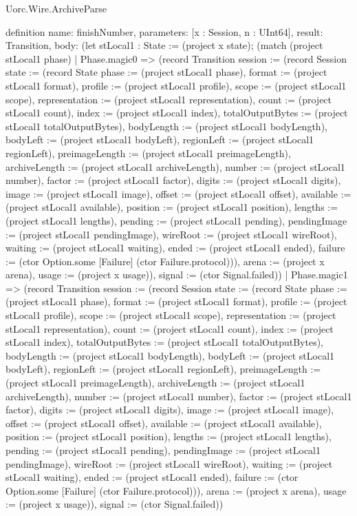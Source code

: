 \begin{lexlean}{Uorc.Wire.ArchiveParse}
\begin{semanticmodule}
definition{
  name: finishNumber,
  parameters: [x : Session, n : UInt64],
  result: Transition,
  body: (let stLocal1 : State := (project x state); (match (project stLocal1 phase)
    | Phase.magic0 => (record Transition {session := (record Session {state := (record State {phase := (project stLocal1 phase), format := (project stLocal1 format), profile := (project stLocal1 profile), scope := (project stLocal1 scope), representation := (project stLocal1 representation), count := (project stLocal1 count), index := (project stLocal1 index), totalOutputBytes := (project stLocal1 totalOutputBytes), bodyLength := (project stLocal1 bodyLength), bodyLeft := (project stLocal1 bodyLeft), regionLeft := (project stLocal1 regionLeft), preimageLength := (project stLocal1 preimageLength), archiveLength := (project stLocal1 archiveLength), number := (project stLocal1 number), factor := (project stLocal1 factor), digits := (project stLocal1 digits), image := (project stLocal1 image), offset := (project stLocal1 offset), available := (project stLocal1 available), position := (project stLocal1 position), lengths := (project stLocal1 lengths), pending := (project stLocal1 pending), pendingImage := (project stLocal1 pendingImage), wireRoot := (project stLocal1 wireRoot), waiting := (project stLocal1 waiting), ended := (project stLocal1 ended), failure := (ctor Option.some [Failure] (ctor Failure.protocol))}), arena := (project x arena), usage := (project x usage)}), signal := (ctor Signal.failed)})
    | Phase.magic1 => (record Transition {session := (record Session {state := (record State {phase := (project stLocal1 phase), format := (project stLocal1 format), profile := (project stLocal1 profile), scope := (project stLocal1 scope), representation := (project stLocal1 representation), count := (project stLocal1 count), index := (project stLocal1 index), totalOutputBytes := (project stLocal1 totalOutputBytes), bodyLength := (project stLocal1 bodyLength), bodyLeft := (project stLocal1 bodyLeft), regionLeft := (project stLocal1 regionLeft), preimageLength := (project stLocal1 preimageLength), archiveLength := (project stLocal1 archiveLength), number := (project stLocal1 number), factor := (project stLocal1 factor), digits := (project stLocal1 digits), image := (project stLocal1 image), offset := (project stLocal1 offset), available := (project stLocal1 available), position := (project stLocal1 position), lengths := (project stLocal1 lengths), pending := (project stLocal1 pending), pendingImage := (project stLocal1 pendingImage), wireRoot := (project stLocal1 wireRoot), waiting := (project stLocal1 waiting), ended := (project stLocal1 ended), failure := (ctor Option.some [Failure] (ctor Failure.protocol))}), arena := (project x arena), usage := (project x usage)}), signal := (ctor Signal.failed)})
}
\end{semanticmodule}
\end{lexlean}
